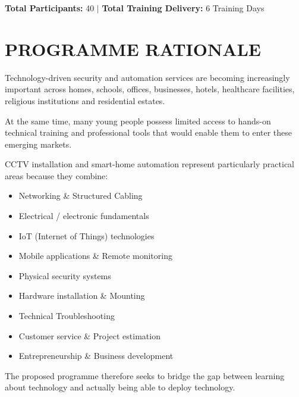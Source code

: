 \documentclass[11pt,a4paper]{article}
\newcommand{\checkicon}{\textcolor{baytblue}{\faCheckCircle}\ }
\begin{document}
\vspace{4pt}
\begin{tcolorbox}[baytbox]
\begin{center}
    \textbf{Total Participants:} 40 $|$ \textbf{Total Training Delivery:} 6 Training Days
\end{center}
\end{tcolorbox}

\section{PROGRAMME RATIONALE}
Technology-driven security and automation services are becoming increasingly important across homes, schools, offices, businesses, hotels, healthcare facilities, religious institutions and residential estates.

At the same time, many young people possess limited access to hands-on technical training and professional tools that would enable them to enter these emerging markets.

CCTV installation and smart-home automation represent particularly practical areas because they combine:
\begin{itemize}[label=\checkicon]
    \item Networking \& Structured Cabling
    \item Electrical / electronic fundamentals
    \item IoT (Internet of Things) technologies
    \item Mobile applications \& Remote monitoring
    \item Physical security systems
    \item Hardware installation \& Mounting
    \item Technical Troubleshooting
    \item Customer service \& Project estimation
    \item Entrepreneurship \& Business development
\end{itemize}

The proposed programme therefore seeks to bridge the gap between learning about technology and actually being able to deploy technology.

\end{document}
